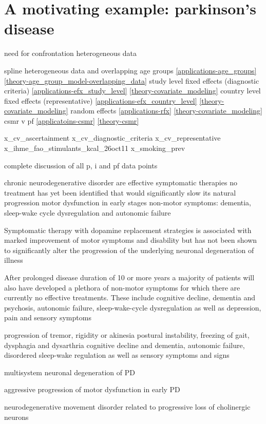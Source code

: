 \section{A motivating example: parkinson's disease}
\label{intro-complete_ex}

need for confrontation
heterogeneous data

spline
heterogeneous data and overlapping age groups \ref{applications-age_groups} \ref{theory-age_group_model-overlapping_data}
study level fixed effects (diagnostic criteria) \ref{applications-efx_study_level} \ref{theory-covariate_modeling}
country level fixed effects (representative) \ref{applications-efx_country_level} \ref{theory-covariate_modeling}
random effects \ref{applications-rfx} \ref{theory-covariate_modeling}
csmr v pf \ref{applicatoins-csmr} \ref{theory-csmr}


x_cv_ascertainment
x_cv_diagnostic_criteria
x_cv_representative
x_ihme_fao_stimulants_kcal_26oct11
x_smoking_prev

complete discussion of all p, i and pf data points


chronic neurodegenerative disorder
are effective symptomatic therapies
no treatment has yet been identified that would significantly slow its natural progression
motor dysfunction in early stages
non-motor symptoms: dementia, sleep-wake cycle dysregulation and autonomic failure

Symptomatic therapy with dopamine replacement strategies is associated with marked improvement of motor symptoms and disability but has not been shown to significantly alter
the progression of the underlying neuronal degeneration of illness

After prolonged disease duration of 10 or more years a majority of patients will
also have developed a plethora of non-motor symptoms for which there are currently no effective treatments. These include cognitive decline, dementia and psychosis, autonomic failure, sleep-wake-cycle dysregulation as well as depression, pain and sensory symptoms

progression of tremor, rigidity or akinesia
postural instability, freezing of gait, dysphagia and dysarthria
cognitive decline and dementia, autonomic failure, disordered sleep-wake regulation as
well as sensory symptoms and signs

multisystem neuronal degeneration of PD

aggressive progression of motor dysfunction in early PD

neurodegenerative movement disorder related to progressive loss of cholinergic neurons

